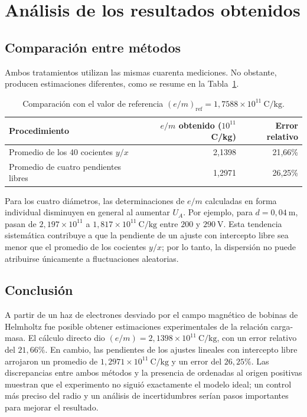 \documentclass{article}
\begin{document}
\section{Análisis de los resultados obtenidos}
\subsection{Comparación entre métodos}
Ambos tratamientos utilizan las mismas cuarenta mediciones. No obstante, producen estimaciones diferentes, como se resume en la Tabla~\ref{tab:comparacion}.
\begin{table}[H]
\centering\small
\caption{Comparación con el valor de referencia ${(e/m)}_{\mathrm{ref}}=1{,}7588\times10^{11}\ \mathrm{C/kg}$.}\label{tab:comparacion}
\begin{tabular}{l r r}
\toprule
Procedimiento & $e/m$ obtenido ($10^{11}$ C/kg) & Error relativo\\
\midrule
Promedio de los 40 cocientes $y/x$ & 2,1398 & 21,66\%\\
Promedio de cuatro pendientes libres & 1,2971 & 26,25\%\\
\bottomrule
\end{tabular}
\end{table}

Para los cuatro diámetros, las determinaciones de $e/m$ calculadas en forma individual disminuyen en general al aumentar $U_A$. Por ejemplo, para $d=0{,}04\ \mathrm{m}$, pasan de $2{,}197\times10^{11}$ a $1{,}817\times10^{11}\ \mathrm{C/kg}$ entre $200$ y $290\ \mathrm V$. Esta tendencia sistemática contribuye a que la pendiente de un ajuste con intercepto libre sea menor que el promedio de los cocientes $y/x$; por lo tanto, la dispersión no puede atribuirse únicamente a fluctuaciones aleatorias.

\subsection{Conclusión}
A partir de un haz de electrones desviado por el campo magnético de bobinas de Helmholtz fue posible obtener estimaciones experimentales de la relación carga-masa. El cálculo directo dio $(e/m)=2{,}1398\times10^{11}\ \mathrm{C/kg}$, con un error relativo del $21{,}66\%$. En cambio, las pendientes de los ajustes lineales con intercepto libre arrojaron un promedio de $1{,}2971\times10^{11}\ \mathrm{C/kg}$ y un error del $26{,}25\%$. Las discrepancias entre ambos métodos y la presencia de ordenadas al origen positivas muestran que el experimento no siguió exactamente el modelo ideal; un control más preciso del radio y un análisis de incertidumbres serían pasos importantes para mejorar el resultado.
\end{document}
